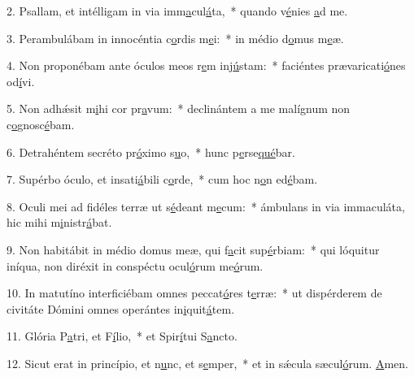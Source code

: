 2. Psallam, et intélligam in via imm\uline{a}cul\uline{á}ta,~* quando v\uline{é}nies \uline{a}d me.\par 
3. Perambulábam in innocéntia c\uline{o}rdis m\uline{e}i:~* in médio d\uline{o}mus m\uline{e}æ.\par 
4. Non proponébam ante óculos meos r\uline{e}m inj\uline{ú}stam:~* faciéntes prævaricati\uline{ó}nes od\uline{í}vi.\par 
5. Non adhǽsit m\uline{i}hi cor pr\uline{a}vum:~* declinántem a me malígnum non c\uline{o}gnosc\uline{é}bam.\par 
6. Detrahéntem secréto pr\uline{ó}ximo s\uline{u}o,~* hunc p\uline{e}rse\uline{qué}bar.\par 
7. Supérbo óculo, et insati\uline{á}bili c\uline{o}rde,~* cum hoc n\uline{o}n ed\uline{é}bam.\par 
8. Oculi mei ad fidéles terræ ut s\uline{é}deant m\uline{e}cum:~* ámbulans in via immaculáta, hic mihi m\uline{i}nistr\uline{á}bat.\par 
9. Non habitábit in médio domus meæ, qui f\uline{a}cit sup\uline{é}rbiam:~* qui lóquitur iníqua, non diréxit in conspéctu ocul\uline{ó}rum me\uline{ó}rum.\par 
10. In matutíno interficiébam omnes peccat\uline{ó}res t\uline{e}rræ:~* ut dispérderem de civitáte Dómini omnes operántes in\uline{i}quit\uline{á}tem.\par 
11. Glória P\uline{a}tri, et F\uline{í}lio,~* et Spir\uline{í}tui S\uline{a}ncto.\par 
12. Sicut erat in princípio, et n\uline{u}nc, et s\uline{e}mper,~* et in sǽcula sæcul\uline{ó}rum. \uline{A}men.\par 
